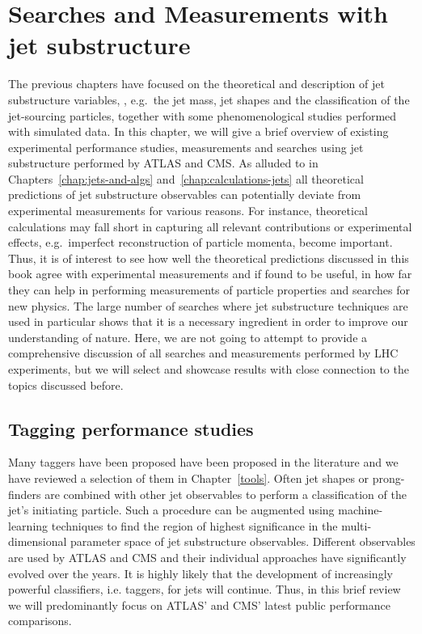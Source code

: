 %
\chapter[Searches and Measurements]{Searches and Measurements with jet substructure}\label{searches-measurements}

The previous chapters have focused on the theoretical and description of jet substructure variables, , e.g.\ the jet mass, jet shapes and the classification of the jet-sourcing particles, together with some phenomenological studies performed with simulated data. In this chapter, we will give a brief overview of existing experimental performance studies, measurements and searches using jet substructure performed by ATLAS and CMS. As alluded to in Chapters~\ref{chap:jets-and-algs} and~\ref{chap:calculations-jets} all theoretical predictions of jet substructure observables can potentially deviate from experimental measurements for various reasons. For instance, theoretical calculations may fall short in capturing all relevant contributions or experimental effects, e.g.\ imperfect reconstruction of particle momenta, become important. Thus, it is of interest to see how well the theoretical predictions discussed in this book agree with experimental measurements and if found to be useful, in how far they can help in performing measurements of particle properties and searches for new physics. The large number of searches where jet substructure techniques are used in particular shows that it is a necessary ingredient in order to improve our understanding of nature. 
%
Here, we are not going to attempt to provide a comprehensive discussion of all searches and measurements performed by LHC experiments, but we will select and showcase results with close connection to the topics discussed before. 

\section{Tagging performance studies}

Many taggers have been proposed have been proposed in the literature and we have reviewed a selection of them in Chapter~\ref{tools}. Often jet shapes or prong-finders are combined with other jet observables to perform a classification of the jet's initiating particle. Such a procedure can be augmented using machine-learning techniques to find the region of highest significance in the multi-dimensional parameter space of jet substructure observables. Different observables are used by ATLAS and CMS and their individual approaches have significantly evolved over the years. It is highly likely that the development of increasingly powerful classifiers, i.e. taggers, for jets will continue. Thus, in this brief review we will predominantly focus on ATLAS' and CMS' latest public performance comparisons.

